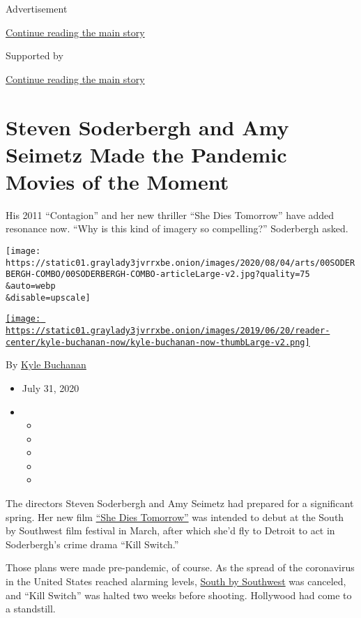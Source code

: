 Advertisement

\protect\hyperlink{after-top}{Continue reading the main story}

Supported by

\protect\hyperlink{after-sponsor}{Continue reading the main story}

\hypertarget{steven-soderbergh-and-amy-seimetz-made-the-pandemic-movies-of-the-moment}{%
\section{Steven Soderbergh and Amy Seimetz Made the Pandemic Movies of
the
Moment}\label{steven-soderbergh-and-amy-seimetz-made-the-pandemic-movies-of-the-moment}}

His 2011 ``Contagion'' and her new thriller ``She Dies Tomorrow'' have
added resonance now. ``Why is this kind of imagery so compelling?''
Soderbergh asked.

\texttt{[image: https://static01.graylady3jvrrxbe.onion/images/2020/08/04/arts/00SODERBERGH-COMBO/00SODERBERGH-COMBO-articleLarge-v2.jpg?quality=75\\\&auto=webp\\\&disable=upscale]}

\href{https://www.nytimes3xbfgragh.onion/by/kyle-buchanan}{\texttt{[image: https://static01.graylady3jvrrxbe.onion/images/2019/06/20/reader-center/kyle-buchanan-now/kyle-buchanan-now-thumbLarge-v2.png]}}

By \href{https://www.nytimes3xbfgragh.onion/by/kyle-buchanan}{Kyle
Buchanan}

\begin{itemize}
\item
  July 31, 2020
\item
  \begin{itemize}
  \item
  \item
  \item
  \item
  \item
  \end{itemize}
\end{itemize}

The directors Steven Soderbergh and Amy Seimetz had prepared for a
significant spring. Her new film
\href{https://www.youtube.com/watch?v=hcMFjCPkP3M}{``She Dies
Tomorrow''} was intended to debut at the South by Southwest film
festival in March, after which she'd fly to Detroit to act in
Soderbergh's crime drama ``Kill Switch.''

Those plans were made pre-pandemic, of course. As the spread of the
coronavirus in the United States reached alarming levels,
\href{https://www.nytimes3xbfgragh.onion/2020/03/06/arts/music/sxsw-cancelled.html}{South
by Southwest} was canceled, and ``Kill Switch'' was halted two weeks
before shooting. Hollywood had come to a standstill.

